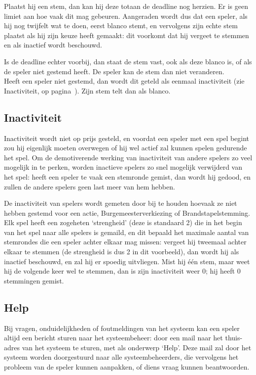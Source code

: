 \documentclass[12pt]{article}
\begin{document}
    Plaatst hij een stem, dan kan hij deze totaan de deadline nog herzien. Er is geen limiet aan hoe vaak dit mag gebeuren. Aangeraden wordt dus dat een speler, als hij nog twijfelt wat te doen, eerst blanco stemt, en vervolgens zijn echte stem plaatst als hij zijn keuze heeft gemaakt: dit voorkomt dat hij vergeet te stemmen en als inactief wordt beschouwd.
    
    Is de deadline echter voorbij, dan staat de stem vast, ook als deze blanco is, of als de speler niet gestemd heeft. De speler kan de stem dan niet veranderen.
    \\[\baselineskip]
    Heeft een speler niet gestemd, dan wordt dit geteld als eenmaal inactiviteit (zie Inactiviteit, op pagina~\pageref{subsec:inactiviteit}). Zijn stem telt dan als blanco.
  
  \subsection{Inactiviteit} \label{subsec:inactiviteit}
  
    Inactiviteit wordt niet op prijs gesteld, en voordat een speler met een spel begint zou hij eigenlijk moeten overwegen of hij wel actief zal kunnen spelen gedurende het spel. Om de demotiverende werking van inactiviteit van andere spelers zo veel mogelijk in te perken, worden inactieve spelers zo snel mogelijk verwijderd van het spel: heeft een speler te vaak een stemronde gemist, dan wordt hij gedood, en zullen de andere spelers geen last meer van hem hebben.
    
    De inactiviteit van spelers wordt gemeten door bij te houden hoevaak ze niet hebben gestemd voor een actie, Burgemeesterverkiezing of Brandstapelstemming. Elk spel heeft een zogeheten `strengheid' (deze is standaard 2) die in het begin van het spel naar alle spelers is gemaild, en dit bepaald het maximale aantal van stemrondes die een speler achter elkaar mag missen: vergeet hij tweemaal achter elkaar te stemmen (de strengheid is dus 2 in dit voorbeeld), dan wordt hij als inactief beschouwd, en zal hij er spoedig uitvliegen. Mist hij \'e\'en stem, maar weet hij de volgende keer wel te stemmen, dan is zijn inactiviteit weer 0; hij heeft 0 stemmingen gemist.

  \subsection{Help} \label{subsec:help}
  
    Bij vragen, onduidelijkheden of foutmeldingen van het systeem kan een speler altijd een bericht sturen naar het systeembeheer: door een mail naar het thuis-adres van het systeem te sturen, met als onderwerp `Help'. Deze mail zal door het systeem worden doorgestuurd naar alle systeembeheerders, die vervolgens het probleem van de speler kunnen aanpakken, of diens vraag kunnen beantwoorden. 
  
\end{document}
